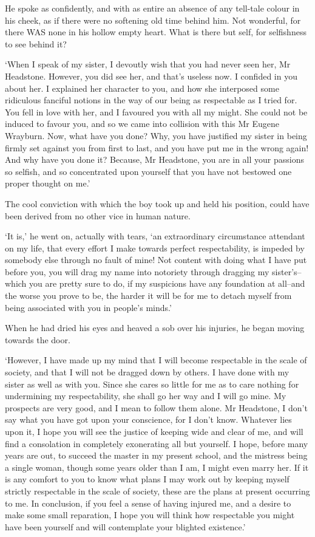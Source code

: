 He spoke as confidently, and with as entire an absence of any tell-tale
colour in his cheek, as if there were no softening old time behind him.
Not wonderful, for there WAS none in his hollow empty heart. What is
there but self, for selfishness to see behind it?

‘When I speak of my sister, I devoutly wish that you had never seen
her, Mr Headstone. However, you did see her, and that’s useless now. I
confided in you about her. I explained her character to you, and how she
interposed some ridiculous fanciful notions in the way of our being as
respectable as I tried for. You fell in love with her, and I favoured
you with all my might. She could not be induced to favour you, and so
we came into collision with this Mr Eugene Wrayburn. Now, what have you
done? Why, you have justified my sister in being firmly set against you
from first to last, and you have put me in the wrong again! And why
have you done it? Because, Mr Headstone, you are in all your passions
so selfish, and so concentrated upon yourself that you have not bestowed
one proper thought on me.’

The cool conviction with which the boy took up and held his position,
could have been derived from no other vice in human nature.

‘It is,’ he went on, actually with tears, ‘an extraordinary circumstance
attendant on my life, that every effort I make towards perfect
respectability, is impeded by somebody else through no fault of mine!
Not content with doing what I have put before you, you will drag my name
into notoriety through dragging my sister’s--which you are pretty sure
to do, if my suspicions have any foundation at all--and the worse you
prove to be, the harder it will be for me to detach myself from being
associated with you in people’s minds.’

When he had dried his eyes and heaved a sob over his injuries, he began
moving towards the door.

‘However, I have made up my mind that I will become respectable in the
scale of society, and that I will not be dragged down by others. I have
done with my sister as well as with you. Since she cares so little for
me as to care nothing for undermining my respectability, she shall go
her way and I will go mine. My prospects are very good, and I mean to
follow them alone. Mr Headstone, I don’t say what you have got upon your
conscience, for I don’t know. Whatever lies upon it, I hope you will see
the justice of keeping wide and clear of me, and will find a consolation
in completely exonerating all but yourself. I hope, before many years
are out, to succeed the master in my present school, and the mistress
being a single woman, though some years older than I am, I might even
marry her. If it is any comfort to you to know what plans I may work out
by keeping myself strictly respectable in the scale of society, these
are the plans at present occurring to me. In conclusion, if you feel a
sense of having injured me, and a desire to make some small reparation,
I hope you will think how respectable you might have been yourself and
will contemplate your blighted existence.’

